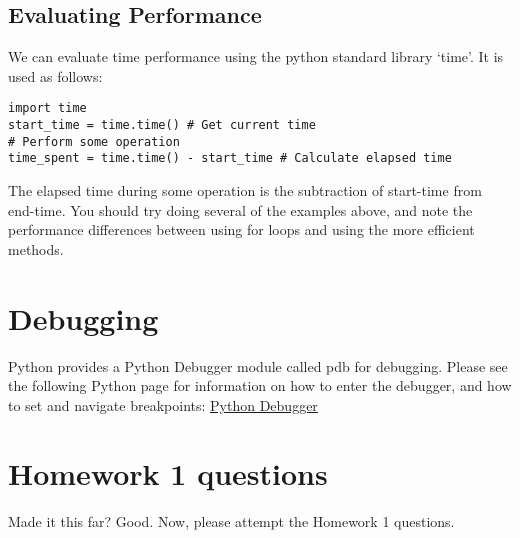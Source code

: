 \documentclass{article}
\begin{document}
\subsection{Evaluating Performance}

We can evaluate time performance using the python standard library `time'. It is used as follows:
\begin{lstlisting}
import time
start_time = time.time() # Get current time
# Perform some operation
time_spent = time.time() - start_time # Calculate elapsed time
\end{lstlisting}
The elapsed time during some operation is the subtraction of start-time from end-time. You should try doing several of the examples above, and note the performance differences between using for loops and using the more efficient methods.


\section{Debugging}
\label{sec:debugger}

Python provides a Python Debugger module called pdb for debugging. Please see the following Python page for information on how to enter the debugger, and how to set and navigate breakpoints:
\href{https://docs.python.org/3/library/pdb.html}{Python Debugger}


\section{Homework 1 questions}
Made it this far? Good. Now, please attempt the Homework 1 questions.
\end{document}

